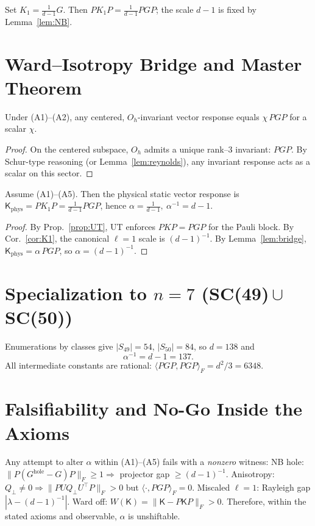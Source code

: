 \begin{corollary}[Canonical $\ell=1$ operator]
\label{cor:K1}
Set \(K_1=\frac{1}{d-1}G\). Then \(PK_1P=\frac{1}{d-1}PGP\); the scale \(d-1\) is fixed by Lemma~\ref{lem:NB}.
\end{corollary}

\section{Ward–Isotropy Bridge and Master Theorem}
\begin{lemma}[Bridge]
\label{lem:bridge}
Under (A1)–(A2), any centered, \(O_h\)-invariant vector response equals \(\chi\,PGP\) for a scalar \(\chi\).
\end{lemma}
\begin{proof}
On the centered subspace, \(O_h\) admits a unique rank–3 invariant: \(PGP\). By Schur-type reasoning (or Lemma~\ref{lem:reynolds}), any invariant response acts as a scalar on this sector.
\end{proof}

\begin{theorem}[Master Theorem: $\alpha^{-1}=d-1$]
\label{thm:master}
Assume (A1)–(A5). Then the physical static vector response is
\(
\mathsf{K}_{\!\mathrm{phys}}=PK_1P=\frac{1}{d-1}PGP
\),
hence \(
\alpha=\frac{1}{d-1},\ \alpha^{-1}=d-1
\).
\end{theorem}
\begin{proof}
By Prop.~\ref{prop:UT}, UT enforces \(PKP=PGP\) for the Pauli block. By Cor.~\ref{cor:K1}, the canonical \(\ell=1\) scale is \((d-1)^{-1}\). By Lemma~\ref{lem:bridge}, \(\mathsf{K}_{\!\mathrm{phys}}=\alpha\,PGP\), so \(\alpha=(d-1)^{-1}\).
\end{proof}

\section{Specialization to $n=7$ (SC(49)\,$\cup$\,SC(50))}
Enumerations by classes give \(|S_{49}|=54\), \(|S_{50}|=84\), so \(d=138\) and
\[
\boxed{\ \alpha^{-1}=d-1=137.\ }
\]
All intermediate constants are rational: \(\langle PGP,PGP\rangle_F=d^2/3=6348\).

\section{Falsifiability and No-Go Inside the Axioms}
Any attempt to alter \(\alpha\) within (A1)–(A5) fails with a \emph{nonzero} witness:
NB hole: \(\|P(G^{\mathrm{hole}}-G)P\|_F\ge 1\Rightarrow\) projector gap \(\ge (d-1)^{-1}\).
Anisotropy: \(Q_\perp\neq 0\Rightarrow\|PUQ_\perp U^\top P\|_F>0\) but \(\langle\cdot,PGP\rangle_F=0\).
Miscaled \(\ell=1\): Rayleigh gap \(|\lambda-(d-1)^{-1}|\).
Ward off: \(W(\mathsf{K})=\|\mathsf{K}-P\mathsf{K}P\|_F>0\).
Therefore, within the stated axioms and observable, \(\alpha\) is unshiftable.

